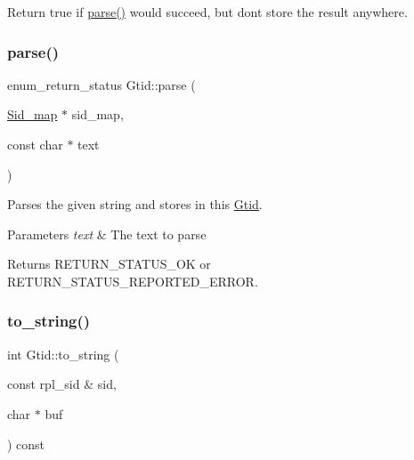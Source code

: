 Return true if \mbox{\hyperlink{structGtid_aac7d6a154262abb97af871d7f31aad42}{parse()}} would succeed, but don\textquotesingle{}t store the result anywhere. \mbox{\label{structGtid_aac7d6a154262abb97af871d7f31aad42}} 
\subsubsection{\texorpdfstring{parse()}{parse()}}
{\footnotesize\ttfamily enum\+\_\+return\+\_\+status Gtid\+::parse (\begin{DoxyParamCaption}\item[{\mbox{\hyperlink{classSid__map}{Sid\+\_\+map}} $\ast$}]{sid\+\_\+map,  }\item[{const char $\ast$}]{text }\end{DoxyParamCaption})}

Parses the given string and stores in this \mbox{\hyperlink{structGtid}{Gtid}}.


\begin{DoxyParams}{Parameters}
{\em text} & The text to parse \\
\hline
\end{DoxyParams}
\begin{DoxyReturn}{Returns}
R\+E\+T\+U\+R\+N\+\_\+\+S\+T\+A\+T\+U\+S\+\_\+\+OK or R\+E\+T\+U\+R\+N\+\_\+\+S\+T\+A\+T\+U\+S\+\_\+\+R\+E\+P\+O\+R\+T\+E\+D\+\_\+\+E\+R\+R\+OR. 
\end{DoxyReturn}
\mbox{\label{structGtid_afd7d2616cf9263cd09d25b6cd645ea4d}} 
\subsubsection{\texorpdfstring{to\+\_\+string()}{to\_string()}\hspace{0.1cm}{\footnotesize\ttfamily [1/2]}}
{\footnotesize\ttfamily int Gtid\+::to\+\_\+string (\begin{DoxyParamCaption}\item[{const rpl\+\_\+sid \&}]{sid,  }\item[{char $\ast$}]{buf }\end{DoxyParamCaption}) const}

